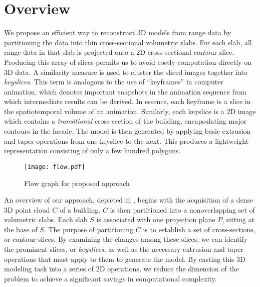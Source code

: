\section{Overview}

We propose an efficient way to reconstruct 3D models from range data by
partitioning the data into thin cross-sectional volumetric slabs.
For each slab, all range data in that slab is projected onto a 2D
cross-sectional contour slice.
Producing this array of slices permits us to avoid costly computation directly
on 3D data.
A similarity measure \cite{IR_Brown, IR_ZF, RE_WWLZ} is used to 
cluster the sliced images together into {\it keyslices}.
This term is analogous to the use of ``keyframes'' in computer animation,
which denotes important snapshots in the animation sequence from which
intermediate results can be derived.
In essence, each keyframe is a slice in the spatiotemporal volume of
an animation.
Similarly, each keyslice is a 2D image which contains a {\it transitional}
cross-section of the building, encapsulating major contours in the facade.
The model is then generated by applying basic extrusion and taper
operations from one keyslice to the next.
This produces a lightweight representation consisting of only a few
hundred polygons.

\begin{figure}[htb]
  \centering
  \texttt{[image: flow.pdf]}
      \caption{Flow graph for proposed approach}
      \label{fig:flow}
\end{figure}

An overview of our approach, depicted in , begins with the
acquisition of a dense 3D point cloud $C$ of a building.
$C$ is then partitioned into a nonoverlapping set of volumetric slabs.
Each slab $S$ is associated with one projection plane $P$,
sitting at the base of $S$.
The purpose of partitioning $C$ is to establish a set of cross-sections,
or contour slices.
By examining the changes among these slices, we can identify the prominent
slices, or {\it keyslices}, as well as the necessary extrusion and
taper operations that must apply to them to generate the model.
By casting this 3D modeling task into a series of 2D operations, we
reduce the dimension of the problem to achieve a significant savings in
computational complexity.

